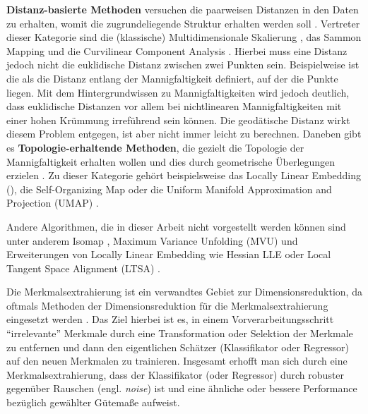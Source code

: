 \textbf{Distanz-basierte Methoden} versuchen die paarweisen Distanzen in den Daten zu erhalten, womit die zugrundeliegende Struktur erhalten werden soll \parencite[3]{Gracia.2014}. Vertreter dieser Kategorie sind die (klassische) Multidimensionale
Skalierung \parencites{Kruskal.1964}{Cox.2008}, das Sammon Mapping \addref und die Curvilinear Component Analysis
\addref. Hierbei muss eine Distanz jedoch nicht die euklidische Distanz zwischen zwei Punkten sein.
Beispielweise ist die  als die Distanz entlang der Mannigfaltigkeit
definiert, auf der die Punkte liegen. Mit dem Hintergrundwissen zu Mannigfaltigkeiten wird jedoch
deutlich, dass euklidische Distanzen vor allem bei nichtlinearen Mannigfaltigkeiten mit einer hohen
Krümmung irreführend sein können. Die geodätische Distanz wirkt diesem Problem entgegen, ist aber
nicht immer leicht zu berechnen. Daneben gibt es \textbf{Topologie-erhaltende Methoden}, die
gezielt die Topologie der Mannigfaltigkeit erhalten wollen und dies durch geometrische Überlegungen
erzielen \parencite[4]{Gracia.2014}. Zu dieser Kategorie gehört beispielsweise das Locally Linear Embedding
(), die Self-Organizing Map \parencite{Kohonen.1990} oder die Uniform Manifold Approximation and Projection (UMAP) \parencite{McInnes.2018}.

Andere Algorithmen, die in dieser Arbeit nicht vorgestellt werden können sind unter anderem Isomap \parencite{Tenenbaum.2000}, Maximum Variance Unfolding (MVU) \parencite{Weinberger.2006} und Erweiterungen von Locally Linear Embedding wie Hessian LLE \parencite{Donoho.2003} oder Local Tangent Space Alignment (LTSA) \parencite{Zhang.2002}.

Die Merkmalsextrahierung ist ein verwandtes Gebiet zur Dimensionsreduktion, da oftmals Methoden der
Dimensionsreduktion für die Merkmalsextrahierung eingesetzt werden \parencite[3]{Guyon.2006b}. Das Ziel hierbei ist es, in einem Vorverarbeitungsschritt
\enquote{irrelevante} Merkmale durch eine Transformation oder Selektion der Merkmale zu entfernen
und dann den eigentlichen Schätzer (Klassifikator oder Regressor) auf den neuen Merkmalen zu
trainieren. Insgesamt erhofft man sich durch eine Merkmalsextrahierung, dass der Klassifikator
(oder Regressor) durch robuster gegenüber Rauschen (engl. \textit{noise}) ist und eine ähnliche
oder bessere Performance bezüglich gewählter Gütemaße aufweist.

